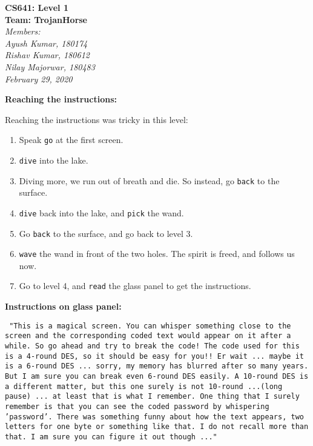 \documentclass[11pt]{article}
\begin{document}
\begin{center}
  \Large\textbf{CS641: Level 1}\\
  \Large\textbf{Team: TrojanHorse}\\
  \medskip
  \large\textit{Members:\quad}\\
  \large\textit{Ayush Kumar, 180174\quad}\\
  \large\textit{Rishav Kumar, 180612\quad}\\
  \large\textit{Nilay Majorwar, 180483\quad}\\
  \medskip
  \large\textit{February 29, 2020\quad}
\end{center}

\bigskip
\bigskip

\textbf{Reaching the instructions: }
\medskip

Reaching the instructions was tricky in this level:
\begin{enumerate}
  \item Speak \texttt{go} at the first screen.
  \item \texttt{dive} into the lake.
  \item Diving more, we run out of breath and die. So instead, go \texttt{back} to the surface.
  \item \texttt{dive} back into the lake, and \texttt{pick} the wand.
  \item Go \texttt{back} to the surface, and go back to level 3.
  \item \texttt{wave} the wand in front of the two holes. The spirit is freed, and follows us now.
  \item Go to level 4, and \texttt{read} the glass panel to get the instructions. 
\end{enumerate}

\bigskip
\bigskip

\textbf{Instructions on glass panel: }

\begin{center}
  \texttt{
    "This is a magical screen. You can whisper something close to the screen and the corresponding coded text would appear on it after a while. So go ahead and try to break the code! The code used for this is a 4-round DES, so it should be easy for you!! Er wait ... maybe it is a 6-round DES ... sorry, my memory has blurred after so many years. But I am sure you can break even 6-round DES easily. A 10-round DES is a different matter, but this one surely is not 10-round ...(long pause) ... at least that is what I remember. One thing that I surely remember is that you can see the coded password by whispering 'password'. There was something funny about how the text appears, two letters for one byte or something like that. I do not recall more than that. I am sure you can figure it out though ..."
  }
\end{center}
\end{document}

